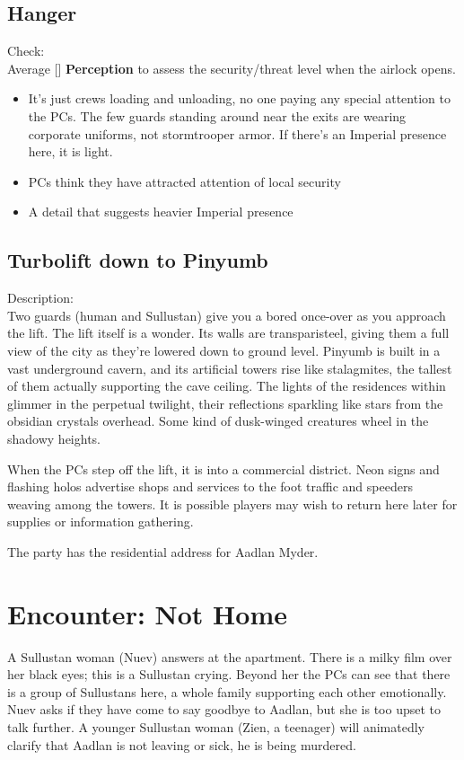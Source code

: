 \documentclass{book}
\newcommand{\df}{\difficulty}
\begin{document}
\begin{multicols*}{2}
\subsection{Hanger}
Check:\\
Average [\df\df] \textbf{Perception} to assess the security/threat level when the airlock opens.
\begin{itemize}
    \item \success It’s just crews loading and unloading, no one paying any special attention to the PCs. The few guards standing around near the exits are wearing corporate uniforms, not stormtrooper armor. If there’s an Imperial presence here, it is light.
    \item \failure PCs think they have attracted attention of local security
    \item \threat A detail that suggests heavier Imperial presence
\end{itemize}

\subsection{Turbolift down to Pinyumb}
Description:\\
Two guards (human and Sullustan) give you a bored once-over as you approach the lift. The lift itself is a wonder. Its walls are transparisteel, giving them a full view of the city as they’re lowered down to ground level. Pinyumb is built in a vast underground cavern, and its artificial towers rise like stalagmites, the tallest of them actually supporting the cave ceiling. The lights of the residences within glimmer in the perpetual twilight, their reflections sparkling like stars from the obsidian crystals overhead. Some kind of dusk-winged creatures wheel in the shadowy heights.

When the PCs step off the lift, it is into a commercial district. Neon signs and flashing holos advertise shops and services to the foot traffic and speeders weaving among the towers. It is possible players may wish to return here later for supplies or information gathering.

The party has the residential address for Aadlan Myder.

\section{Encounter: Not Home}

A Sullustan woman (Nuev) answers at the apartment. There is a milky film over her black eyes; this is a Sullustan crying. Beyond her the PCs can see that there is a group of Sullustans here, a whole family supporting each other emotionally.  Nuev asks if they have come to say goodbye to Aadlan, but she is too upset to talk further.  A younger Sullustan woman (Zien, a teenager) will animatedly clarify that Aadlan is not leaving or sick, he is being murdered.


\end{multicols*}
\end{document}

